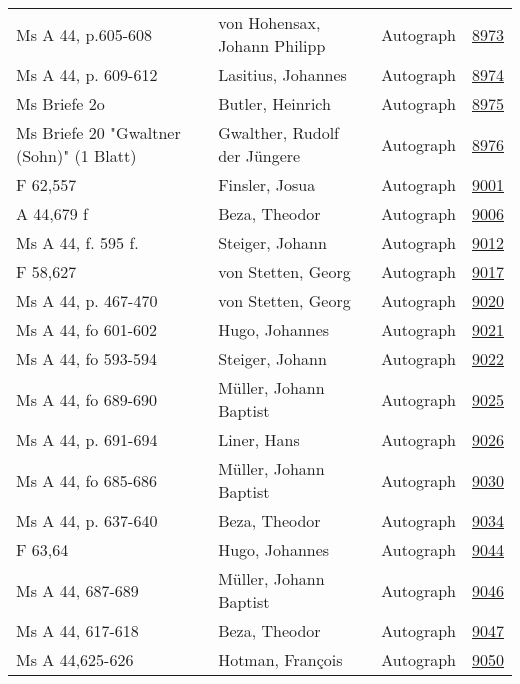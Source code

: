 \documentclass[10pt,a4paper,landscape]{report}
\begin{document}
\begin{longtable}{p{16cm}p{4cm}lr}
Ms A 44, p.605-608	&	von Hohensax, Johann Philipp	&	Autograph	&	\href{http://130.60.24.72/assignment/8973}{8973}\\
Ms A 44, p. 609-612	&	Lasitius, Johannes	&	Autograph	&	\href{http://130.60.24.72/assignment/8974}{8974}\\
Ms Briefe 2o	&	Butler, Heinrich	&	Autograph	&	\href{http://130.60.24.72/assignment/8975}{8975}\\
Ms Briefe 20 "Gwaltner (Sohn)" (1 Blatt)	&	Gwalther, Rudolf der Jüngere	&	Autograph	&	\href{http://130.60.24.72/assignment/8976}{8976}\\
F 62,557	&	Finsler, Josua	&	Autograph	&	\href{http://130.60.24.72/assignment/9001}{9001}\\
A 44,679 f	&	Beza, Theodor	&	Autograph	&	\href{http://130.60.24.72/assignment/9006}{9006}\\
Ms A 44, f. 595 f.	&	Steiger, Johann	&	Autograph	&	\href{http://130.60.24.72/assignment/9012}{9012}\\
F 58,627	&	von Stetten, Georg	&	Autograph	&	\href{http://130.60.24.72/assignment/9017}{9017}\\
Ms A 44, p. 467-470	&	von Stetten, Georg	&	Autograph	&	\href{http://130.60.24.72/assignment/9020}{9020}\\
Ms A 44, fo 601-602	&	Hugo, Johannes	&	Autograph	&	\href{http://130.60.24.72/assignment/9021}{9021}\\
Ms A 44, fo 593-594	&	Steiger, Johann	&	Autograph	&	\href{http://130.60.24.72/assignment/9022}{9022}\\
Ms A 44, fo 689-690	&	Müller, Johann Baptist	&	Autograph	&	\href{http://130.60.24.72/assignment/9025}{9025}\\
Ms A 44, p. 691-694	&	Liner, Hans	&	Autograph	&	\href{http://130.60.24.72/assignment/9026}{9026}\\
Ms A 44, fo 685-686	&	Müller, Johann Baptist	&	Autograph	&	\href{http://130.60.24.72/assignment/9030}{9030}\\
Ms A 44, p. 637-640	&	Beza, Theodor	&	Autograph	&	\href{http://130.60.24.72/assignment/9034}{9034}\\
F 63,64	&	Hugo, Johannes	&	Autograph	&	\href{http://130.60.24.72/assignment/9044}{9044}\\
Ms A 44, 687-689	&	Müller, Johann Baptist	&	Autograph	&	\href{http://130.60.24.72/assignment/9046}{9046}\\
Ms A 44, 617-618	&	Beza, Theodor	&	Autograph	&	\href{http://130.60.24.72/assignment/9047}{9047}\\
Ms A 44,625-626	&	Hotman, François	&	Autograph	&	\href{http://130.60.24.72/assignment/9050}{9050}\\

\end{longtable}
\end{document}
